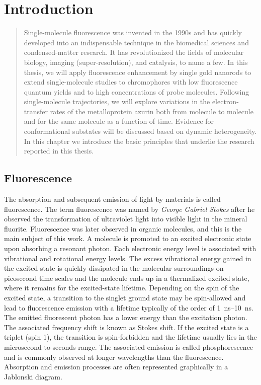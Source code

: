 \chapter{Introduction}
\label{chapter:intro}
\graphicspath{{./chapters/c1_intro/figures/}}
\begin{abstract}
	Single-molecule fluorescence was invented in the 1990s and has quickly developed into an indispensable technique in the biomedical sciences and condensed-matter research. It has revolutionized the fields of molecular biology, imaging (super-resolution), and catalysis, to name a few. In this thesis, we will apply fluorescence enhancement by single gold nanorods to extend single-molecule studies to chromophores with low fluorescence quantum yields and to high concentrations of probe molecules. Following single-molecule trajectories, we will explore variations in the electron-transfer rates of the metalloprotein azurin both from molecule to molecule and for the same molecule as a function of time. Evidence for conformational substates will be discussed based on dynamic heterogeneity. In this chapter we introduce the basic principles that underlie the research reported in this thesis.
\end{abstract}
\newpage
\section{Fluorescence}
The absorption and subsequent emission of light by materials is called fluorescence.
The term fluorescence was named by \textit{George Gabriel Stokes} after he observed the transformation of ultraviolet light into visible light in the mineral fluorite.\cite{Stokes1852} Fluorescence was later observed in organic molecules, and this is the main subject of this work.
A molecule is promoted to an excited electronic state upon absorbing a resonant photon.
Each electronic energy level is associated with vibrational and rotational energy levels.
The excess vibrational energy gained in the excited state is quickly dissipated in the molecular surroundings on picosecond time scales and the molecule ends up in a thermalized excited state, where it remains for the excited-state lifetime. Depending on the spin of the excited state, a transition to the singlet ground state may be spin-allowed and lead to fluorescence emission with a lifetime typically of the order of \SIrange{1}{10}{\ns}. The emitted fluorescent photon has a lower energy than the excitation photon. The associated frequency shift is known as Stokes shift.
If the excited state is a triplet (spin 1), the transition is spin-forbidden and the lifetime usually lies in the microsecond to seconds range. The associated emission is called  phosphorescence and is commonly observed at longer wavelengths than the fluorescence.
Absorption and emission processes are often represented graphically in a Jablonski diagram.\cite{RohatgiMukherjee1979k,Lakowicz1999book}

